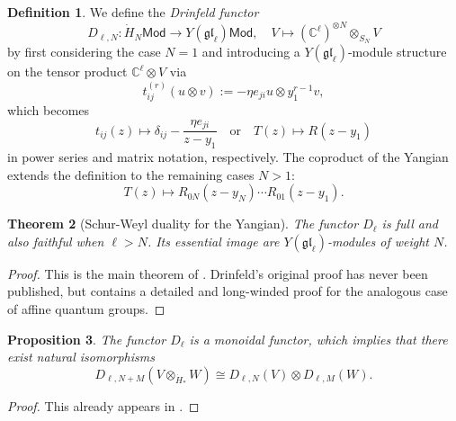 \documentclass[11pt]{report}
\newtheorem{theorem}{Theorem}[section]
\newtheorem{prop}[theorem]{Proposition}
\theoremstyle{definition}
\newtheorem{definition}[theorem]{Definition}
\theoremstyle{remark}
\theoremstyle{remark}
\newcommand{\C}{\mathbb{C}}
\begin{document}
\begin{definition}
We define the \emph{Drinfeld functor}
\begin{equation*}
D_{\ell,N}: \dot H_N\mathsf{Mod} \to Y(\mathfrak{gl}_\ell)\mathsf{Mod}, \quad V \mapsto (\C^\ell)^{\otimes N} \otimes_{S_N} V
\end{equation*}
by first considering the case $N=1$ and introducing a $Y(\mathfrak{gl}_\ell)$-module structure on the tensor product $\C^\ell \otimes V$ via
\begin{equation*}
t_{ij}^{(r)}(u \otimes v) := -\eta e_{ji} u \otimes y_1^{r-1} v,
\end{equation*}
which becomes
\begin{equation*}
t_{ij}(z) \mapsto \delta_{ij} - \frac{\eta e_{ji}}{z-y_1} \quad \text{or} \quad T(z) \mapsto R(z-y_1)
\end{equation*}
in power series and matrix notation, respectively. The coproduct of the Yangian extends the definition to the remaining cases $N > 1$:
\begin{equation*}
T(z) \mapsto R_{0N}(z-y_N) \cdots R_{01}(z-y_1).
\end{equation*}
\end{definition}

\begin{theorem}[Schur-Weyl duality for the Yangian]
The functor $D_\ell$ is full and also faithful when $\ell > N$. Its essential image are $Y(\mathfrak{gl}_\ell)$-modules of weight $N$.
\end{theorem}

\begin{proof}
This is the main theorem of \cite{article:drinfeld:1986}. Drinfeld's original proof has never been published, but \cite{article:chari:1995} contains a detailed and long-winded proof for the analogous case of affine quantum groups.
\end{proof}

\begin{prop}
The functor $D_\ell$ is a monoidal functor, which implies that there exist natural isomorphisms
\begin{equation*}
D_{\ell,N+M}(V \otimes_{\dot H_*} W) \cong D_{\ell,N}(V) \otimes D_{\ell,M}(W).
\end{equation*}
\end{prop}

\begin{proof}
This already appears in \cite{article:drinfeld:1986}.
\end{proof}
\end{document}
